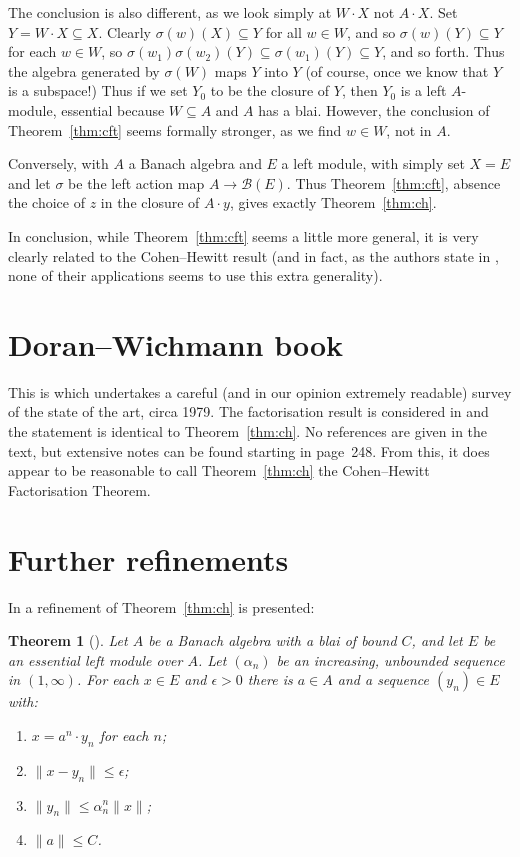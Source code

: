 \documentclass[a4paper,11pt]{article}
\newcommand{\mc}[1]{{\mathcal{#1}}}
\newtheorem{theorem}[lemma]{Theorem}
\theoremstyle{definition}
\begin{document}
The conclusion is also different, as we look simply at $W\cdot X$ not $A\cdot X$.  Set
$Y = W\cdot X \subseteq X$.  Clearly $\sigma(w)(X) \subseteq Y$ for all $w\in W$, and so
$\sigma(w)(Y) \subseteq Y$ for each $w\in W$, so $\sigma(w_1) \sigma(w_2)(Y) \subseteq
\sigma(w_1)(Y) \subseteq Y$, and so forth.  Thus the algebra generated by $\sigma(W)$
maps $Y$ into $Y$ (of course, once we know that $Y$ is a subspace!)
Thus if we set $Y_0$ to be the closure of $Y$, then $Y_0$ is a
left $A$-module, essential because $W\subseteq A$ and $A$ has a blai.  However,
the conclusion of Theorem~\ref{thm:cft} seems formally stronger, as we find $w\in W$, not
in $A$.

Conversely, with $A$ a Banach algebra and $E$ a left module, with simply set $X=E$ and
let $\sigma$ be the left action map $A\rightarrow\mc B(E)$.  Thus Theorem~\ref{thm:cft},
absence the choice of $z$ in the closure of $A\cdot y$, gives exactly Theorem~\ref{thm:ch}.

In conclusion, while Theorem~\ref{thm:cft} seems a little more general, it is very
clearly related to the Cohen--Hewitt result (and in fact, as the authors state in
\cite{cft}, none of their applications seems to use this extra generality).




\section{Doran--Wichmann book}

This is \cite{dw} which undertakes a careful (and in our opinion extremely readable) survey
of the state of the art, circa 1979.  The factorisation result is considered in
\cite[Section~16]{dw} and the statement is identical to Theorem~\ref{thm:ch}.  No references
are given in the text, but extensive notes can be found starting in page~248.  From this,
it does appear to be reasonable to call Theorem~\ref{thm:ch} the Cohen--Hewitt Factorisation
Theorem.



\section{Further refinements}

In \cite[Theorem~2.9.24]{dales} a refinement of Theorem~\ref{thm:ch} is presented:

\begin{theorem}[{\cite[Theorem~2.9.24]{dales}}]
Let $A$ be a Banach algebra with a blai of bound $C$, and let $E$ be an essential left module
over $A$.  Let $(\alpha_n)$ be an increasing, unbounded sequence in $(1,\infty)$.
For each $x\in E$ and $\epsilon>0$ there is $a\in A$ and a sequence $(y_n)\in E$ with:
\begin{enumerate}
\item $x = a^n\cdot y_n$ for each $n$;
\item $\|x-y_n\| \leq \epsilon$;
\item $\|y_n\| \leq \alpha^n_n \|x\|$;
\item $\|a\| \leq C$.
\end{enumerate}  
\end{theorem}
\end{document}
